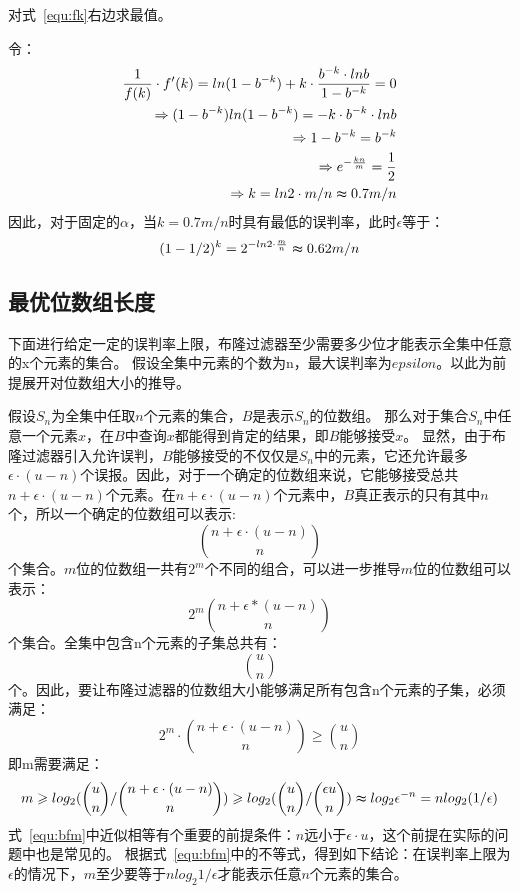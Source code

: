 对式~\ref{equ:fk}右边求最值。

令：
\begin{equation}
\begin{split}
\frac{1}{f(k)}\cdot f'(k) = ln(1 - b^{-k}) + k\cdot \frac{b^{-k}\cdot lnb}{1 - b^{-k}} = 0 \\
\Rightarrow (1 - b^{-k}) ln(1 - b^{-k}) = -k\cdot b^{-k}\cdot lnb \\
\Rightarrow 1 - b^{-k} = b^{-k} \\
\Rightarrow e^{-\frac{kn}{m}} = \frac{1}{2}\\
\Rightarrow k = ln2\cdot {m/n} \thickapprox 0.7{m/n}
\end{split}
\end{equation}
因此，对于固定的$\alpha$，当$k = 0.7{m/n}$时具有最低的误判率，此时$\epsilon$等于：
\begin{equation}
(1 - {1/2})^k = 2^{-ln2\cdot\frac{m}{n}} \thickapprox 0.62{m/n}
\end{equation}

\subsection{最优位数组长度}
\label{sec:opt_m}
下面进行给定一定的误判率上限，布隆过滤器至少需要多少位才能表示全集中任意的x个元素的集合。
假设全集中元素的个数为n，最大误判率为$epsilon$。以此为前提展开对位数组大小的推导。

假设$S_n$为全集中任取$n$个元素的集合，$B$是表示$S_n$的位数组。
那么对于集合$S_n$中任意一个元素$x$，在$B$中查询$x$都能得到肯定的结果，即$B$能够接受$x$。
显然，由于布隆过滤器引入允许误判，$B$能够接受的不仅仅是$S_n$中的元素，它还允许最多$\epsilon \cdot(u - n)$个误报。因此，对于一个确定的位数组来说，它能够接受总共$n +\epsilon\cdot(u - n)$个元素。在$n + \epsilon\cdot(u - n)$个元素中，$B$真正表示的只有其中$n$个，所以一个确定的位数组可以表示:
\begin{equation}
\binom{n + \epsilon \cdot(u - n)}{n}
\end{equation}
个集合。$m$位的位数组一共有$2^m$个不同的组合，可以进一步推导$m$位的位数组可以表示：
\begin{equation}
2^m\binom{n + \epsilon *\left(u - n\right)}{n}
\end{equation}
个集合。全集中包含n个元素的子集总共有：
\begin{equation}
\binom{u}{n}
\end{equation}
个。因此，要让布隆过滤器的位数组大小能够满足所有包含n个元素的子集，必须满足：
\begin{equation}
2^m\cdot\binom{n + \epsilon \cdot(u - n)}{n} \geq \binom{u}{n}
\end{equation}
即m需要满足：
\begin{equation}
m \geq log_2({\binom{u}{n}/\binom{n + \epsilon \cdot(u - n)}{n}}) \geq log_2({\binom{u}{n}/\binom{\epsilon u}{n}}) \thickapprox log_2\epsilon^{-n} = n log_2({1/\epsilon})
\label{equ:bfm}
\end{equation}
式~\ref{equ:bfm}中近似相等有个重要的前提条件：$n$远小于$\epsilon\cdot u$，这个前提在实际的问题中也是常见的。
根据式~\ref{equ:bfm}中的不等式，得到如下结论：在误判率上限为$\epsilon$的情况下，$m$至少要等于$nlog_2{1/\epsilon}$才能表示任意$n$个元素的集合。

